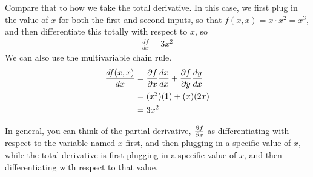 Compare that to how we take the total derivative. In this case, we first plug in the value of $x$ for both the first and second inputs, so that $f(x, x) = x \cdot x^2 = x^3$, and then differentiate this totally with respect to $x$, so
\begin{align*}
    \frac{df}{dx} = 3x^2
\end{align*}
We can also use the multivariable chain rule.
\begin{align*}
    \frac{df(x, x)}{dx} &= \frac{\partial f}{\partial x} \frac{dx}{dx} + \frac{\partial f}{\partial y} \frac{dy}{dx} \\
    &= (x^2) (1)+ (x) (2x) \\
    &= 3x^2
\end{align*}

In general, you can think of the partial derivative, $\frac{\partial f}{\partial x}$ as differentiating with respect to the variable named $x$ first, and then plugging in a specific value of $x$, while the total derivative is first plugging in a specific value of $x$, and then differentiating with respect to that value. 